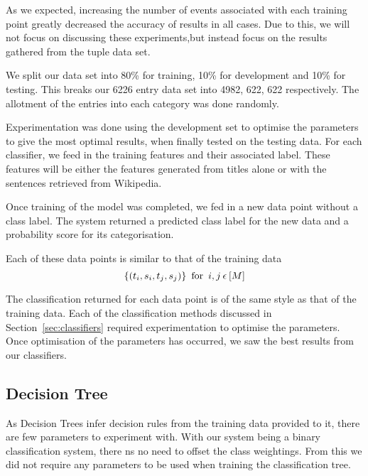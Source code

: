 \documentclass[bsc,frontabs,twoside,singlespacing,parskip,deptreport]{infthesis}     %
\begin{document}
As we expected, increasing the number of events associated with each training point greatly decreased the accuracy of results in all cases.
Due to this, we will not focus on discussing these experiments,but instead focus on the results gathered from the tuple data set.

We split our data set into 80\% for training, 10\% for development and 10\% for testing.
This breaks our 6226 entry data set into 4982, 622, 622 respectively.
The allotment of the entries into each category was done randomly.

Experimentation was done using the development set to optimise the parameters to give the most optimal results,
when finally tested on the testing data.
For each classifier, we feed in the training features and their associated label. These features will
be either the features generated from titles alone or with the sentences retrieved from Wikipedia.

Once training of the model was completed, we fed in a new data point without a class label.
The system returned a predicted class label for the new data and a probability score for its categorisation.

Each of these data points is similar to that of the training data
 \begin{equation}
   \{(t_{i},s_{i},t_{j},s_{j})\} \hspace{0.5em} \text{for} \hspace{0.5em} i,j \hspace{0.2em}\epsilon \hspace{0.2em}[M]\nonumber
 \end{equation}

 The classification returned for each data point is of the same style as that of the training data.
 Each of the classification methods discussed in Section~\ref{sec:classifiers} required experimentation to optimise the
 parameters. Once optimisation of the parameters has occurred, we saw the best results from our classifiers.

 \subsection{Decision Tree}
 As Decision Trees infer decision rules from the training data provided to it, there are few parameters to
 experiment with. With our system being a binary classification system, there  ns no need to offset the class weightings.
 From this we did not require any parameters to be used when training the classification tree.
 
\end{document}
